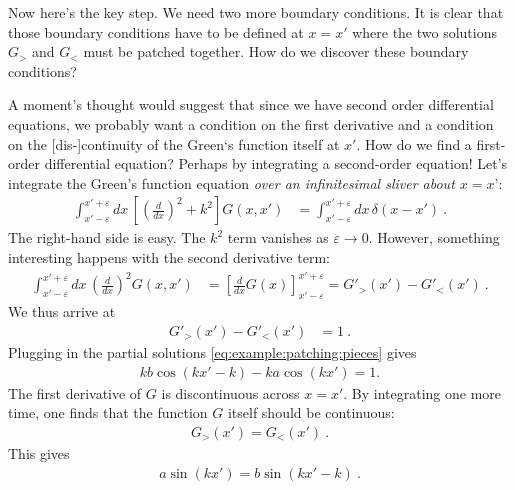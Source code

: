 \documentclass[12pt]{article}
\numberwithin{equation}{section}    %
\begin{document}
Now here’s the key step. We need two more boundary conditions. It is clear that those boundary conditions have to be defined at $x=x'$ where the two solutions $G_>$ and $G_<$ must be patched together. How do we discover these boundary conditions? 

A moment’s thought would suggest that since we have second order differential equations, we probably want a condition on the first derivative and a condition on the [dis-]continuity of the Green‘s function itself at $x'$. How do we find a first-order differential equation? Perhaps by integrating a second-order equation! Let’s integrate the Green’s function equation \emph{over an infinitesimal sliver about $x=x’$}:
\begin{align}
  \int_{x'-\varepsilon}^{x'+\varepsilon}  dx\,
  \left[
    \left(\frac{d}{dx}\right)^2 + k^2\right] G(x,x') 
    &=
  \int_{x'-\varepsilon}^{x'+\varepsilon}  dx\,
  \delta(x-x') \ .
\end{align}
The right-hand side is easy. The $k^2$ term vanishes as $\varepsilon\to 0$. However, something interesting happens with the second derivative term:
\begin{align}
   \int_{x'-\varepsilon}^{x'+\varepsilon}  dx\,
    \left(\frac{d}{dx}\right)^2 
    G(x,x') 
    &=
    \left[
    \frac{d}{dx}G(x)
    \right]_{x'-\varepsilon}^{x'+\varepsilon}
    = 
    G'_>(x') - G'_<(x') \ .
\end{align}
We thus arrive at
\begin{align}
  G'_>(x') - G'_<(x') &= 1 \ .
\end{align}
Plugging in the partial solutions \eqref{eq:example:patching:pieces} gives
\begin{align}
  kb\cos(kx'-k) - ka\cos(kx') = 1. 
\end{align}
The first derivative of $G$ is discontinuous across $x=x'$. By integrating one more time, one finds that the function $G$ itself should be continuous:
\begin{align}
  G_>(x') = G_<(x') \ .
\end{align}
This gives
\begin{align}
  a\sin(kx') = b\sin(kx'-k) \ .
\end{align}
\end{document}
